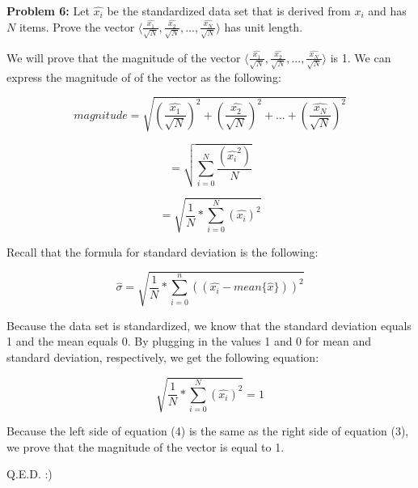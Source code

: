 \documentclass{article}
\begin{document}
 \newpage
 
 \begin{center}
     \Large\textbf{Problem 6:} Let {$\hat{x_i}$} be the standardized data set that is derived from {$x_i$} and has $N$ items. Prove the vector $\langle \frac{\hat{x_1}}{\sqrt{N}}, \frac{\hat{x_2}}{\sqrt{N}}, ... , \frac{\hat{x_N}}{\sqrt{N}} \rangle$ has unit length.\par
 \end{center}
 
 We will prove that the magnitude of the vector $\langle \frac{\hat{x_1}}{\sqrt{N}}, \frac{\hat{x_2}}{\sqrt{N}}, ... , \frac{\hat{x_N}}{\sqrt{N}} \rangle$ is 1. We can express the magnitude of of the vector as the following:
 
 \begin{equation}
    magnitude = \sqrt{(\frac{\hat{x_1}}{\sqrt{N}})^2 + (\frac{\hat{x_2}}{\sqrt{N}})^2 + ... + (\frac{\hat{x_N}}{\sqrt{N}})^2} 
 \end{equation}
 
 \begin{equation}
     = \sqrt{\sum_{i=0}^{N}\frac{(\hat{x_i}^2)}{N}}
 \end{equation}
 
 \begin{equation}
     = \sqrt{\frac{1}{N}*\sum_{i=0}^{N}(\hat{x_i})^2}
 \end{equation}
 
 Recall that the formula for standard deviation is the following:
 
 \begin{displaymath}
     \hat{\sigma} = \sqrt{\frac{1}{N}*\sum_{i=0}^{n}((\hat{x_{i}}-mean\{\hat{x}\}))^2}
 \end{displaymath}
 
  Because the data set is standardized, we know that the standard deviation equals 1 and the mean equals 0. By plugging in the values 1 and 0 for mean and standard deviation, respectively, we get the following equation:
 
 \begin{equation}
    \sqrt{\frac{1}{N}*\sum_{i=0}^{N}(\hat{x_i})^2} = 1
 \end{equation}
 
 Because the left side of equation (4) is the same as the right side of equation (3), we prove that the magnitude of the vector is equal to 1.\newline
 
 \begin{center}
     Q.E.D. :)
 \end{center}
 
 
\end{document}

